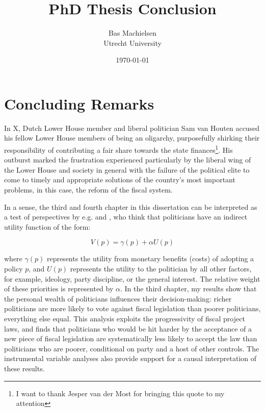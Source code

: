 

\title{\textbf{PhD Thesis Conclusion}}
\author{Bas Machielsen \\ Utrecht University}
\date{\today}



\maketitle

\section{Concluding Remarks}

In X, Dutch Lower House member and liberal politician Sam van Houten accused his fellow Lower House members of being an oligarchy, purposefully shirking their responsibility of contributing a fair share towards the state finances\footnote{I want to thank Jesper van der Most for bringing this quote to my attention}. His outburst marked the frustration experienced particularly by the liberal wing of the Lower House and society in general with the failure of the political elite to come to timely and appropriate solutions of the country's most important problems, in this case, the reform of the fiscal system. 

In a sense, the third and fourth chapter in this dissertation can be interpreted as a test of perspectives by e.g. \cite{tahoun2019personal} and \cite{grossman1996electoral}, who think that politicians have an indirect utility function of the form:

\begin{equation*}
    V(p) = \gamma (p) + \alpha U (p)
\end{equation*}

where $\gamma (p)$ represents the utility from monetary benefits (costs) of adopting a policy $p$, and $U (p)$ represents the utility to the politician by all other factors, for example, ideology, party discipline, or the general interest. The relative weight of these priorities is represented by $\alpha$. In the third chapter, my results show that the personal wealth of politicians influences their decision-making: richer politicians are more likely to vote against fiscal legislation than poorer politicians, everything else equal. This analysis exploits the progressivity of fiscal project laws, and finds that politicians who would be hit harder by the acceptance of a new piece of fiscal legislation are systematically less likely to accept the law than politicians who are poorer, conditional on party and a host of other controls. The instrumental variable analyses also provide support for a causal interpretation of these results. 

